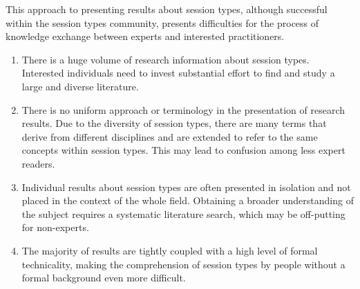 
This approach to presenting results about session types,
although successful within the session types community,
presents difficulties for the process of knowledge exchange
between experts and interested practitioners.

%
\begin{enumerate}
	\item	There is a huge volume of research information about session types.
			Interested individuals need to invest substantial effort to find
			and study a large and diverse literature.

	\item	There is no uniform approach or terminology
			in the presentation of research results.
			Due to the diversity of session types,
			there are many terms that derive from different
			disciplines and are extended to refer to
			the same concepts within session types.
			This may lead to confusion among less
			expert readers.


	\item	Individual results about session types are often presented in
			isolation and not placed in the context of the whole field.
			Obtaining a broader understanding of the subject requires a systematic
			literature search, which may be off-putting for non-experts.


	\item	The majority of results are tightly coupled
			with a high level of formal technicality, making the
			comprehension of session types by people without
			a formal background even more difficult.
\end{enumerate}
